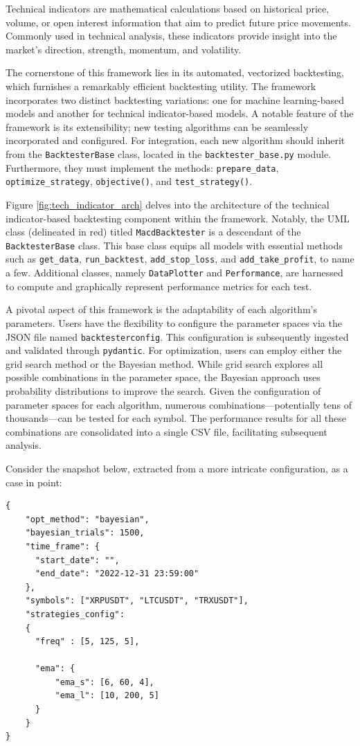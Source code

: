\noindent
Technical indicators are mathematical calculations based on historical price, volume, or open interest information that aim to predict future price movements.
Commonly used in technical analysis, these indicators provide insight into the market's direction, strength, momentum, and volatility.

The cornerstone of this framework lies in its automated, vectorized backtesting, which furnishes a remarkably efficient backtesting utility.
The framework incorporates two distinct backtesting variations: one for machine learning-based models and another for technical indicator-based models.
A notable feature of the framework is its extensibility; new testing algorithms can be seamlessly incorporated and configured.
For integration, each new algorithm should inherit from the \texttt{BacktesterBase} class, located in the \texttt{backtester\_base.py} module.
Furthermore, they must implement the methods: \texttt{prepare\_data}, \texttt{optimize\_strategy}, \texttt{objective()}, and \texttt{test\_strategy()}.

Figure \ref{fig:tech_indicator_arch} delves into the architecture of the technical indicator-based backtesting component within the framework.
Notably, the UML class (delineated in red) titled \texttt{MacdBacktester} is a descendant of the \texttt{BacktesterBase} class.
This base class equips all models with essential methods such as \texttt{get\_data}, \texttt{run\_backtest}, \texttt{add\_stop\_loss}, and \texttt{add\_take\_profit}, to name a few.
Additional classes, namely \texttt{DataPlotter} and \texttt{Performance}, are harnessed to compute and graphically represent performance metrics for each test.

A pivotal aspect of this framework is the adaptability of each algorithm's parameters.
Users have the flexibility to configure the parameter spaces via the JSON file named \texttt{backtesterconfig}.
This configuration is subsequently ingested and validated through \texttt{pydantic}.
For optimization, users can employ either the grid search method or the Bayesian method.
While grid search explores all possible combinations in the parameter space, the Bayesian approach uses probability distributions to improve the search.
Given the configuration of parameter spaces for each algorithm, numerous combinations---potentially tens of thousands---can be tested for each symbol.
The performance results for all these combinations are consolidated into a single CSV file, facilitating subsequent analysis.

Consider the snapshot below, extracted from a more intricate configuration, as a case in point:
\begin{verbatim}
{
    "opt_method": "bayesian",
    "bayesian_trials": 1500,
    "time_frame": {
      "start_date": "",
      "end_date": "2022-12-31 23:59:00"
    },
    "symbols": ["XRPUSDT", "LTCUSDT", "TRXUSDT"],
    "strategies_config":
    {
      "freq" : [5, 125, 5],

      "ema": {
          "ema_s": [6, 60, 4],
          "ema_l": [10, 200, 5]
      }
    }
}
\end{verbatim}



